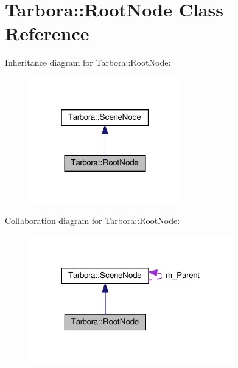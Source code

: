 \hypertarget{classTarbora_1_1RootNode}{}\section{Tarbora\+:\+:Root\+Node Class Reference}
\label{classTarbora_1_1RootNode}


Inheritance diagram for Tarbora\+:\+:Root\+Node\+:\nopagebreak
\begin{figure}[H]
\begin{center}
\leavevmode
\includegraphics[width=187pt]{classTarbora_1_1RootNode__inherit__graph}
\end{center}
\end{figure}


Collaboration diagram for Tarbora\+:\+:Root\+Node\+:\nopagebreak
\begin{figure}[H]
\begin{center}
\leavevmode
\includegraphics[width=251pt]{classTarbora_1_1RootNode__coll__graph}
\end{center}
\end{figure}

